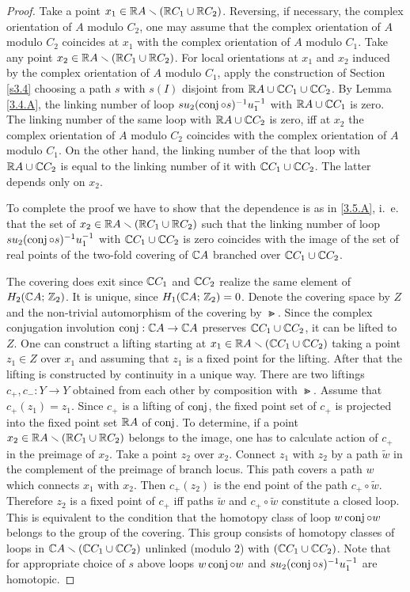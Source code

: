\documentclass{article}
\numberwithin{equation}{section}
\begin{document}
\begin{proof} Take a point $x_1\in\mathbb R A\smallsetminus(\mathbb R C_1\cup\mathbb R C_2)$.
Reversing, if necessary, the complex orientation of $A$ modulo $C_2$,
one may assume that the complex orientation of $A$ modulo $C_2$
coincides at $x_1$ with the complex orientation of $A$ modulo $C_1$.
Take any point $x_2\in\mathbb R A\smallsetminus(\mathbb R C_1\cup\mathbb R C_2)$. For local
orientations at $x_1$ and $x_2$ induced by the complex orientation of
$A$ modulo $C_1$, apply the construction of Section \ref{s3.4} choosing a path
$s$ with $s(I)$ disjoint from $\mathbb R A\cup\mathbb C C_1\cup\mathbb C C_2$. By Lemma
\ref{3.4.A}, the linking number of loop $su_2(\operatorname{conj}\circ s)^{-1}u_1^{-1}$
with $\mathbb R A\cup\mathbb C C_1$ is zero. The linking number of the same loop with
$\mathbb R A\cup\mathbb C C_2$ is zero, iff at $x_2$ the complex orientation of $A$
modulo $C_2$ coincides with the complex orientation of $A$ modulo
$C_1$.  On the other hand, the linking number of the that loop with
$\mathbb R A\cup\mathbb C C_2$ is equal to the linking number of it with $\mathbb C C_1\cup\mathbb C
C_2$. The latter depends only on $x_2$.

To complete the proof we have to show that the dependence is as
in \ref{3.5.A}, i.~e. that the set of $x_2\in \mathbb R A\smallsetminus(\mathbb R C_1\cup\mathbb R C_2)$
such that the linking number of loop $su_2(\operatorname{conj}\circ s)^{-1}u_1^{-1}$
with $\mathbb C C_1\cup\mathbb C C_2$ is zero coincides with the image of the set of
real points of the two-fold covering of $\mathbb C A$ branched over $\mathbb C
C_1\cup\mathbb C C_2$.

The covering does exit since $\mathbb C C_1$ and $\mathbb C C_2$ realize the same
element of $H_2(\mathbb C A;\,\mathbb Z_2)$. It is unique, since $H_1(\mathbb C A;\,\mathbb Z_2)=0$.
Denote the covering space by $Z$ and the non-trivial automorphism of
the covering by $\Gt$. Since the complex conjugation involution
$\operatorname{conj}:\mathbb C A\to\mathbb C A$ preserves $\mathbb C C_1\cup\mathbb C C_2$, it can be lifted to
$Z$. One can construct a lifting starting at
$x_1\in\mathbb R A\smallsetminus(\mathbb C C_1\cup\mathbb C C_2)$ taking a point  $z_1\in Z$ over
$x_1$ and assuming that $z_1$ is a fixed point for the lifting. After
that the lifting is constructed by continuity in a unique way. There
are two liftings $c_+, c_-:Y\to Y$ obtained from each other by
composition with $\Gt$.  Assume that $c_+(z_1)=z_1$. Since $c_+$ is a
lifting of $\operatorname{conj}$, the fixed point set of $c_+$ is projected into the
fixed point set $\mathbb R A$ of $\operatorname{conj}$. To determine, if a point
$x_2\in\mathbb R A\smallsetminus(\mathbb R C_1\cup\mathbb R C_2)$ belongs to the image, one has to
calculate action of $c_+$ in the preimage of $x_2$. Take a point $z_2$
over $x_2$. Connect $z_1$ with $z_2$ by a path $\tilde w$ in the
complement of the preimage of branch locus. This path covers a path $w$
which connects $x_1$ with $x_2$. Then $c_+(z_2)$ is the end point of
the path $c_+\circ\tilde w$.  Therefore $z_2$ is a fixed point of $c_+$
iff paths $\tilde w$ and $c_+\circ\tilde w$ constitute a closed loop.
This is equivalent to the condition that the homotopy class of
loop $w\operatorname{conj}\circ w$ belongs to the group of the covering. This group
consists of homotopy classes of loops in $\mathbb C A\smallsetminus(\mathbb C C_1\cup\mathbb C
C_2)$ unlinked (modulo 2) with $(\mathbb C C_1\cup\mathbb C C_2)$. Note that for
appropriate choice of $s$ above loops $w\operatorname{conj}\circ w$ and
$su_2(\operatorname{conj}\circ s)^{-1}u_1^{-1}$ are homotopic. %
\end{proof}
\end{document}
